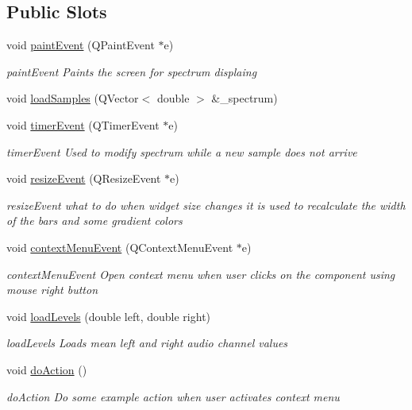 \subsection*{Public Slots}
\begin{DoxyCompactItemize}
\item 
void \hyperlink{class_spectrograph_a22138fa296829fb5449202f262e64bf5}{paint\-Event} (Q\-Paint\-Event $\ast$e)
\begin{DoxyCompactList}\small\item\em paint\-Event Paints the screen for spectrum displaing \end{DoxyCompactList}\item 
void \hyperlink{class_spectrograph_ae94e6b07459f40c57ed7db97f5d32cf1}{load\-Samples} (Q\-Vector$<$ double $>$ \&\-\_\-spectrum)
\item 
void \hyperlink{class_spectrograph_af690851ad862181732979bdfa88b2dbe}{timer\-Event} (Q\-Timer\-Event $\ast$e)
\begin{DoxyCompactList}\small\item\em timer\-Event Used to modify spectrum while a new sample does not arrive \end{DoxyCompactList}\item 
void \hyperlink{class_spectrograph_a06514c3f632bc47c7da2cfd66330e85e}{resize\-Event} (Q\-Resize\-Event $\ast$e)
\begin{DoxyCompactList}\small\item\em resize\-Event what to do when widget size changes it is used to recalculate the width of the bars and some gradient colors \end{DoxyCompactList}\item 
void \hyperlink{class_spectrograph_a934531dccea6339a990fff27cdff4dad}{context\-Menu\-Event} (Q\-Context\-Menu\-Event $\ast$e)
\begin{DoxyCompactList}\small\item\em context\-Menu\-Event Open context menu when user clicks on the component using mouse right button \end{DoxyCompactList}\item 
void \hyperlink{class_spectrograph_aeb2d9200c513b1de462de5f16c4cb0ca}{load\-Levels} (double left, double right)
\begin{DoxyCompactList}\small\item\em load\-Levels Loads mean left and right audio channel values \end{DoxyCompactList}\item 
void \hyperlink{class_spectrograph_aa583f92a0df8fcdd7887c9b45c488658}{do\-Action} ()
\begin{DoxyCompactList}\small\item\em do\-Action Do some example action when user activates context menu \end{DoxyCompactList}\end{DoxyCompactItemize}
